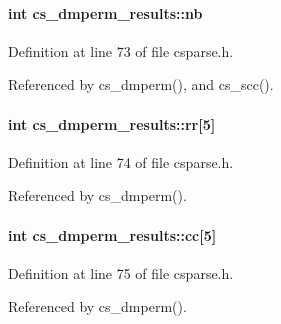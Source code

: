 \hypertarget{structcs__dmperm__results_a273a6867c52fb2c813575d73ed0d40ee}{
\paragraph[{nb}]{\setlength{\rightskip}{0pt plus 5cm}int cs\-\_\-dmperm\-\_\-results\-::nb}}\label{structcs__dmperm__results_a273a6867c52fb2c813575d73ed0d40ee}


Definition at line 73 of file csparse.\-h.



Referenced by cs\-\_\-dmperm(), and cs\-\_\-scc().

\hypertarget{structcs__dmperm__results_af17bae097d2ceb70ca1e8d96006bc225}{
\paragraph[{rr}]{\setlength{\rightskip}{0pt plus 5cm}int cs\-\_\-dmperm\-\_\-results\-::rr\mbox{[}5\mbox{]}}}\label{structcs__dmperm__results_af17bae097d2ceb70ca1e8d96006bc225}


Definition at line 74 of file csparse.\-h.



Referenced by cs\-\_\-dmperm().

\hypertarget{structcs__dmperm__results_ae56ca45f0058903a3c1e586cff63ecef}{
\paragraph[{cc}]{\setlength{\rightskip}{0pt plus 5cm}int cs\-\_\-dmperm\-\_\-results\-::cc\mbox{[}5\mbox{]}}}\label{structcs__dmperm__results_ae56ca45f0058903a3c1e586cff63ecef}


Definition at line 75 of file csparse.\-h.



Referenced by cs\-\_\-dmperm().

